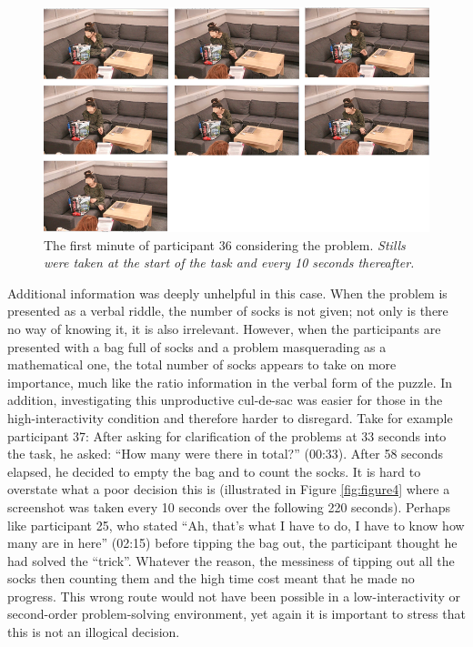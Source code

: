 \documentclass[twocolumn, serif, empirical, authordate]{jote-article}
\begin{document}
\begin{figure}

\vskip5pt
 \includegraphics[width=\columnwidth]{media/image3.png} 
\caption{The first minute of participant 36 considering the problem. \emph{Stills were taken at the start of the task and every 10 seconds thereafter.}}
\label{fig:figure3}
\vskip7pt
\end{figure}


Additional information was deeply unhelpful in this case. When the problem is presented as a verbal riddle, the number of socks is not given; not only is there no way of knowing it, it is also irrelevant. However, when the participants are presented with a bag full of socks and a problem masquerading as a mathematical one, the total number of socks appears to take on more importance, much like the ratio information in the verbal form of the puzzle. In addition, investigating this unproductive cul-de-sac was easier for those in the high-interactivity condition and therefore harder to disregard. Take for example participant 37: After asking for clarification of the problems at 33 seconds into the task, he asked: ``How many were there in total?'' (00:33). After 58 seconds elapsed, he decided to empty the bag and to count the socks. It is hard to overstate what a poor decision this is (illustrated in Figure \ref{fig:figure4} where a screenshot was taken every 10 seconds over the following 220 seconds). Perhaps like participant 25, who stated ``Ah, that's what I have to do, I have to know how many are in here'' (02:15) before tipping the bag out, the participant thought he had solved the ``trick''. Whatever the reason, the messiness of tipping out all the socks then counting them and the high time cost meant that he made no progress. This wrong route would not have been possible in a low-interactivity or second-order problem-solving environment, yet again it is important to stress that this is not an illogical decision. 
\end{document}
